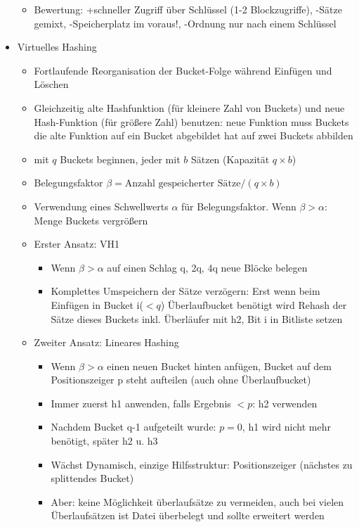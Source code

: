 \documentclass[a4paper, 12pt]{scrartcl}
\begin{document}
\begin{itemize}
\begin{itemize}
			\item
				Bewertung: +schneller Zugriff über Schlüssel (1-2 Blockzugriffe), -Sätze gemixt, -Speicherplatz im voraus!, -Ordnung nur nach einem Schlüssel
		\end{itemize}
	\item
		Virtuelles Hashing
		\begin{itemize}
			\item
				Fortlaufende Reorganisation der Bucket-Folge während Einfügen und Löschen
			\item
				Gleichzeitig alte Hashfunktion (für kleinere Zahl von Buckets) und neue Hash-Funktion (für größere Zahl) benutzen: neue Funktion muss Buckets die alte Funktion auf ein Bucket abgebildet hat auf zwei Buckets abbilden
			\item
				mit $q$ Buckets beginnen, jeder mit $b$ Sätzen (Kapazität $q\times b$)
			\item
				Belegungsfaktor $\beta = \text{Anzahl gespeicherter Sätze}/(q\times b)$
			\item
				Verwendung eines Schwellwerts $\alpha$ für Belegungsfaktor. Wenn $\beta > \alpha$: Menge Buckets vergrößern
			\item
				Erster Ansatz: VH1
				\begin{itemize}
					\item
						Wenn $\beta > \alpha$ auf einen Schlag q, 2q, 4q neue Blöcke belegen
					\item
						Komplettes Umspeichern der Sätze verzögern: Erst wenn beim Einfügen in Bucket i($<q$) Überlaufbucket benötigt wird Rehash der Sätze dieses Buckets inkl. Überläufer mit h2, Bit i in Bitliste setzen
				\end{itemize}
			\item
				Zweiter Ansatz: Lineares Hashing
				\begin{itemize}
					\item Wenn $\beta > \alpha$ einen neuen Bucket hinten anfügen, Bucket auf dem Positionszeiger p steht aufteilen (auch ohne Überlaufbucket)
					\item
						Immer zuerst h1 anwenden, falls Ergebnis $< p$: h2 verwenden
					\item
						Nachdem Bucket q-1 aufgeteilt wurde: $p=0$, h1 wird nicht mehr benötigt, später h2 u. h3
					\item Wächst Dynamisch, einzige Hilfsstruktur: Positionszeiger (nächstes zu splittendes Bucket)
					\item
						Aber: keine Möglichkeit überlaufsätze zu vermeiden, auch bei vielen Überlaufsätzen ist Datei überbelegt und sollte erweitert werden
				\end{itemize}
		\end{itemize}
\end{itemize}
\end{document}
